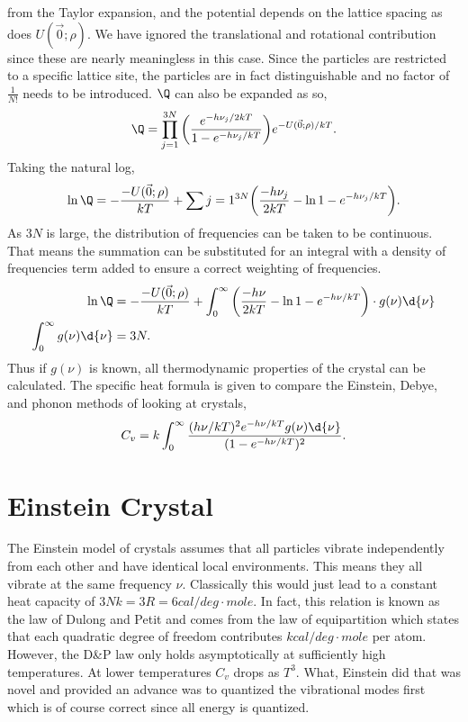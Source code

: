 from the Taylor expansion, and the potential depends on the lattice spacing as
does $U(\vec{0}; \rho)$. We have ignored the translational and rotational
contribution since these are nearly meaningless in this case. Since the
particles are restricted to a specific lattice site, the particles are in fact
distinguishable and no factor of $\frac{1}{N!}$ needs to be introduced. $\Q$ can
also be expanded as so,
\begin{equation*}
	\Q = \prod_{j=1}^{3N}{{\left(\frac{e^{-h\nu_{j}/2kT}}{1 -
	e^{-h\nu_{j}/kT}}\right)}e^{-U(\vec{0}; \rho)/kT}}.
\end{equation*}
Taking the natural log,
\begin{equation*}
	\ln{\Q} = - \frac{-U(\vec{0}; \rho)}{kT} +
	\sum{j=1}^{3N}{{\left(\frac{-h\nu_{j}}{2kT} - \ln{1 -
	e^{-h\nu_{j}/kT}}\right)}}.
\end{equation*}
As $3N$ is large, the distribution of frequencies can be taken to be continuous.
That means the summation can be substituted for an integral with a density of
frequencies term added to ensure a correct weighting of frequencies.
\begin{align*}
	\ln{\Q} &= - \frac{-U(\vec{0}; \rho)}{kT} +
	\int_{0}^{\infty}{{\left(\frac{-h\nu}{2kT} - \ln{1 -
	e^{-h\nu/kT}}\right)} \cdot g(\nu) \d{\nu}}\\
	\int_{0}^{\infty}{g(\nu)\d{\nu}} &= 3N.
\end{align*}
Thus if $g(\nu)$ is known, all thermodynamic properties of the crystal can be
calculated. The specific heat formula is given to compare the Einstein, Debye,
and phonon methods of looking at crystals,
\begin{equation*}
	C_v = k \int_{0}^{\infty}{\frac{(h\nu /kT)^2 e^{-h\nu/kT} g(\nu) \d{\nu}}{(1
	- e^{-h\nu/kT})^2}}.
\end{equation*}

\section{Einstein Crystal}%
\label{sec:crystal_ein}
The Einstein model of crystals assumes that all particles vibrate independently
from each other and have identical local environments. This means they all
vibrate at the same frequency $\nu$. Classically this would just lead to a
constant heat capacity of $3Nk = 3R = 6 cal/deg \cdot mole$. In fact, this
relation is known as the law of Dulong and Petit and comes from the law of
equipartition which states that each quadratic degree of freedom contributes $k
cal/deg \cdot mole$ per atom. However, the D\&P law only holds asymptotically at
sufficiently high temperatures. At lower temperatures $C_v$ drops as $T^3$.
What, Einstein did that was novel and provided an advance was to quantized the
vibrational modes first which is of course correct since all energy is
quantized. 

